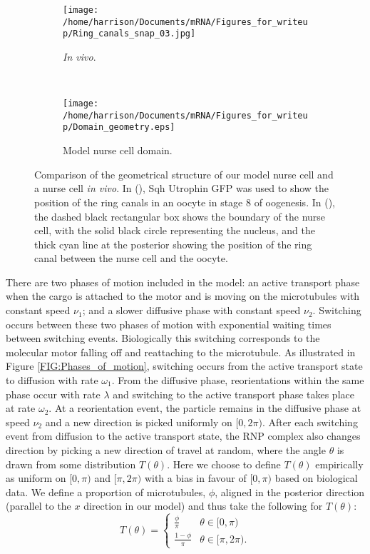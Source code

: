 \documentclass[twocolumn]{biophys}
\begin{document}
\begin{figure}[h]
 \centering
 \begin{subfigure}[b]{0.3\textwidth}
 \texttt{[image: /home/harrison/Documents/mRNA/Figures\_for\_writeup/Ring\_canals\_snap\_03.jpg]}
    \caption[]%
  {{\small \textit{In vivo}.}}    
  \label{fig:vivo}
\end{subfigure}
 ~
  \begin{subfigure}[b]{0.475\textwidth}  
      \centering 
      \texttt{[image: /home/harrison/Documents/mRNA/Figures\_for\_writeup/Domain\_geometry.eps]}
      \caption[]%
      {{\small Model nurse cell domain.}}    
      \label{fig:model}
  \end{subfigure}
  \caption{\small Comparison of the geometrical structure of our model nurse cell and a nurse cell \textit{in vivo}. 
  In (), Sqh Utrophin GFP was used to show the position of the ring canals in an oocyte in stage 8 of oogenesis. 
  In (), the dashed black rectangular box shows the boundary of the nurse cell, with the solid black circle representing the nucleus, and the thick cyan line at the posterior showing the position of the ring canal between the nurse cell and the oocyte.}  
  \label{FIG:geometry}      
\end{figure}

There are two phases of motion included in the model: an active transport phase when the cargo is attached to the motor and is moving on the microtubules with constant speed $\nu_1$; and a slower diffusive phase with constant speed $\nu_2$.
Switching occurs between these two phases of motion with exponential waiting times between switching events.
Biologically this switching corresponds to the molecular motor falling off and reattaching to the microtubule.
As illustrated in Figure \ref{FIG:Phases_of_motion}, switching occurs from the active transport state to diffusion with rate $\omega_1$. 
From the diffusive phase, reorientations within the same phase occur with rate $\lambda$ and switching to the active transport phase takes place at rate $\omega_2$. 
At a reorientation event, the particle remains in the diffusive phase at speed $\nu_2$ and a new direction is picked uniformly on $[0,2\pi)$.
After each switching event from diffusion to the active transport state, the RNP complex also changes direction by picking a new direction of travel at random, where the angle $\theta $ is drawn from some distribution $T(\theta)$. 
Here we choose to define $T(\theta)$ empirically as uniform on $[0,\pi )$ and $[\pi, 2\pi )$ with a bias in favour of $[0,\pi )$ based on biological data.
We define a proportion of microtubules, $\phi$, aligned in the posterior direction (parallel to the $x$ direction in our model) and thus take the following for $T(\theta)$:
\begin{equation*}         
T(\theta) = \begin{cases} \frac{\phi}{\pi} &  \theta \in [0,\pi) \\ \frac{1-\phi}{\pi} &  \theta \in [\pi,2\pi).                       
\end{cases}
\end{equation*}
\end{document}
